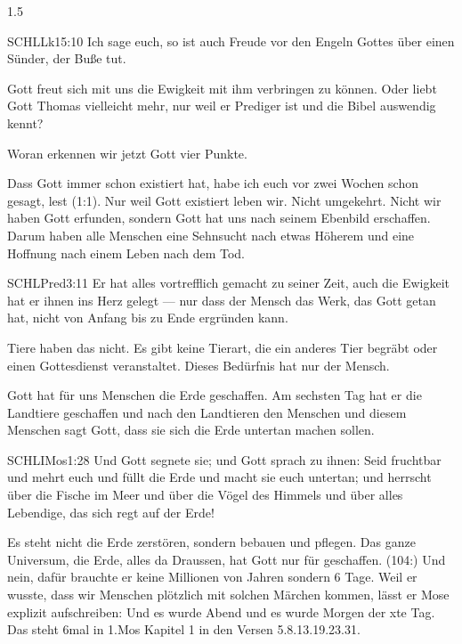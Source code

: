 \documentclass[fontsize=14pt]{../../inc/mybib}
\begin{document}
\begin{spacing}{1.5}
\begin{block}
\begin{block}
\begin{bibelbox}{SCHL}{Lk}{15:10}
        Ich sage euch, so ist auch Freude vor den Engeln Gottes über einen Sünder, der Buße tut.
        \end{bibelbox}
        Gott freut sich mit uns die Ewigkeit mit ihm verbringen zu können. Oder liebt Gott Thomas vielleicht mehr, nur weil er Prediger ist und die Bibel auswendig kennt? 
        \end{block}
        Woran erkennen wir jetzt Gott vier Punkte. 
        \\
        \begin{block}
        Dass Gott immer schon existiert hat, habe ich euch vor zwei Wochen schon gesagt, lest (1:1). Nur weil Gott existiert leben wir. Nicht umgekehrt. Nicht wir haben Gott erfunden, sondern Gott hat uns nach seinem Ebenbild erschaffen. Darum haben alle Menschen eine Sehnsucht nach etwas Höherem und eine Hoffnung nach einem Leben nach dem Tod.
        \begin{bibelbox}{SCHL}{Pred}{3:11}
        Er hat alles vortrefflich gemacht zu seiner Zeit, auch die Ewigkeit hat er ihnen ins Herz gelegt — nur dass der Mensch das Werk, das Gott getan hat, nicht von Anfang bis zu Ende ergründen kann.
        \end{bibelbox}
        Tiere haben das nicht. Es gibt keine Tierart, die ein anderes Tier begräbt oder einen Gottesdienst veranstaltet. Dieses Bedürfnis hat nur der Mensch.
        \\
        \end{block}
        \begin{block}
        Gott hat für uns Menschen die Erde geschaffen. Am sechsten Tag hat er die Landtiere geschaffen und nach den Landtieren den Menschen und diesem Menschen sagt Gott, dass sie sich die Erde untertan machen sollen. 
        \begin{bibelbox}{SCHL}{IMos}{1:28}
        Und Gott segnete sie; und Gott sprach zu ihnen: Seid fruchtbar und mehrt euch und füllt die Erde und macht sie euch untertan; und herrscht über die Fische im Meer und über die Vögel des Himmels und über alles Lebendige, das sich regt auf der Erde!
        \end{bibelbox}
        Es steht nicht die Erde zerstören, sondern bebauen und pflegen. Das ganze Universum, die Erde, alles da Draussen, hat Gott nur für  geschaffen. (104:) Und nein, dafür brauchte er keine Millionen von Jahren sondern 6 Tage. Weil er wusste, dass wir Menschen plötzlich mit solchen Märchen kommen, lässt er Mose explizit aufschreiben: \flqq Und es wurde Abend und es wurde Morgen der xte Tag.\frqq{} Das steht 6mal in 1.Mos Kapitel 1 in den Versen 5.8.13.19.23.31.


\end{block}
\end{block}
\end{spacing}
\end{document}
